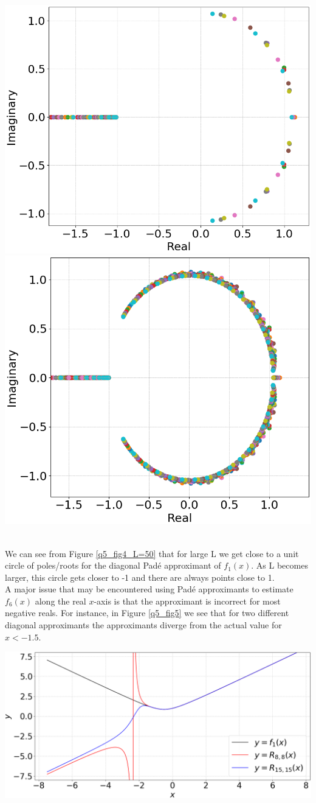 \documentclass[12pt, a4paper]{article}
\begin{document}
\vspace{0.3cm}
\begin{minipage}{\textwidth}
	\centering
	\includegraphics[width=0.51\linewidth]{q5_fig4_L=20}
	\includegraphics[width=0.48\linewidth]{q5_fig4_L=50}
	\label{q5_fig4_L=50}
\end{minipage}
\\

We can see from Figure \ref{q5_fig4_L=50} that for large L we get close to a unit circle
of poles/roots for the diagonal Pad\'e approximant of $f_{1}(x)$. As L becomes larger, this circle
gets closer to -1 and there are always points close to 1.
\\

A major issue that may be encountered using Pad\'e approximants to estimate $f_{6}(x)$ along the
real $x$-axis is that the approximant is incorrect for most negative reals. For instance, in
Figure \ref{q5_fig5} we see that for two different diagonal approximants the approximants diverge
from the actual value for $x<-1.5$.

\begin{minipage}{\textwidth}
	\centering
	\includegraphics[width=\linewidth]{q5_fig5}
	\label{q5_fig5}
\end{minipage}
\\
\end{document}
